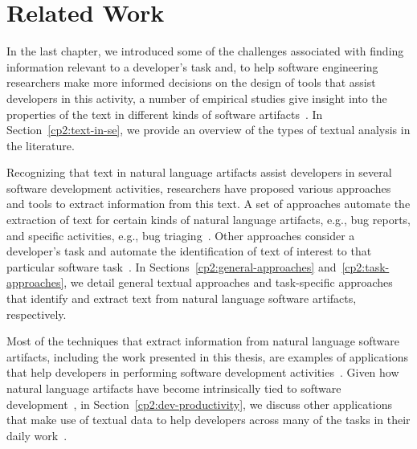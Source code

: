 \setcounter{chapter}{1}


\chapter{Related Work}
\label{ch:related-work}







In the last chapter, we introduced some of the challenges
associated with finding
information relevant to a developer's task 
and, to help 
software engineering researchers make more informed decisions 
on the design of tools 
that assist developers 
in this activity,
 a number of empirical studies give insight 
 into the properties of the text in different kinds of software artifacts~\cite{a}.
 In Section~\ref{cp2:text-in-se}, we provide an 
overview of the types of textual analysis in the literature.





Recognizing that text in natural language
artifacts assist developers in several software development activities,
researchers have 
proposed various approaches and tools 
to extract information from this text. 
A set of approaches automate the extraction of text 
for certain kinds of natural language artifacts, e.g., bug reports, and 
specific activities, e.g., bug triaging~\cite{a}. 
Other approaches consider a developer's task 
and automate the identification of text of interest 
to that particular software task~\cite{a}.
In Sections~\ref{cp2:general-approaches}
and~\ref{cp2:task-approaches}, we
detail general textual approaches 
and task-specific approaches
that identify and extract text from natural language software artifacts, respectively.





Most of the techniques that extract information from natural language software artifacts, including the work presented in this thesis, 
are examples of applications that help developers in performing 
software development activities~\cite{Meyer2017}. 
Given how 
natural language artifacts have become intrinsically
tied to software development~\cite{liu2021, watson2022, umarji2008archetypal},
in Section~\ref{cp2:dev-productivity}, 
we discuss
other applications that make use of textual data
to help developers
across many of the tasks in their daily work~\cite{Treude2016,  robillard2017, silva2019}.




